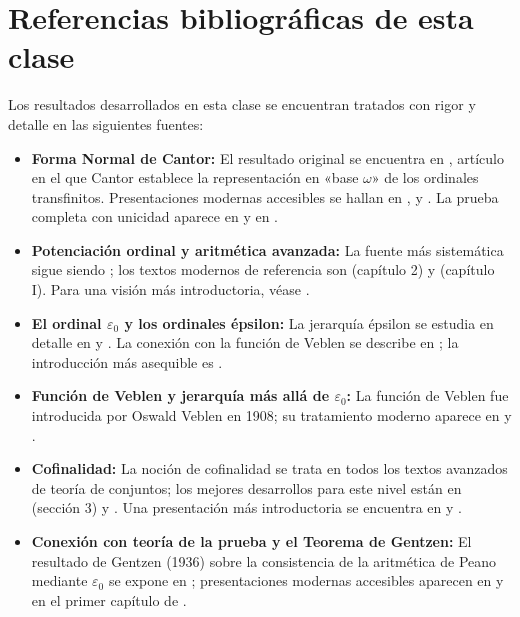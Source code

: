 \section*{Referencias bibliográficas de esta clase}

Los resultados desarrollados en esta clase se encuentran tratados con rigor y detalle en las siguientes fuentes:

\begin{itemize}[leftmargin=2em]
  \item \textbf{Forma Normal de Cantor:} El resultado original se encuentra en \cite{cantor1897}, artículo en el que Cantor establece la representación en «base $\omega$» de los ordinales transfinitos. Presentaciones modernas accesibles se hallan en \cite{enderton1977}, \cite{hrbacek1999} y \cite{devlin1993}. La prueba completa con unicidad aparece en \cite{sierpinski1958} y en \cite{levy1979}.

  \item \textbf{Potenciación ordinal y aritmética avanzada:} La fuente más sistemática sigue siendo \cite{sierpinski1958}; los textos modernos de referencia son \cite{jech2003} (capítulo 2) y \cite{kunen2011} (capítulo I). Para una visión más introductoria, véase \cite{suppes1972}.

  \item \textbf{El ordinal $\varepsilon_0$ y los ordinales épsilon:} La jerarquía épsilon se estudia en detalle en \cite{jech2003} y \cite{levy1979}. La conexión con la función de Veblen se describe en \cite{pohlers1989}; la introducción más asequible es \cite{hrbacek1999}.

  \item \textbf{Función de Veblen y jerarquía más allá de $\varepsilon_0$:} La función de Veblen fue introducida por Oswald Veblen en 1908; su tratamiento moderno aparece en \cite{pohlers1989} y \cite{smorynski1991}.

  \item \textbf{Cofinalidad:} La noción de cofinalidad se trata en todos los textos avanzados de teoría de conjuntos; los mejores desarrollos para este nivel están en \cite{jech2003} (sección 3) y \cite{kunen2011}. Una presentación más introductoria se encuentra en \cite{hrbacek1999} y \cite{devlin1993}.

  \item \textbf{Conexión con teoría de la prueba y el Teorema de Gentzen:} El resultado de Gentzen (1936) sobre la consistencia de la aritmética de Peano mediante $\varepsilon_0$ se expone en \cite{gentzen1936}; presentaciones modernas accesibles aparecen en \cite{smorynski1991} y en el primer capítulo de \cite{pohlers1989}.


\end{itemize}
